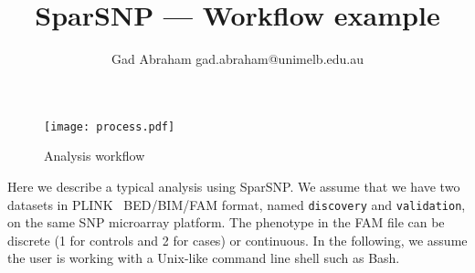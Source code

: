\documentclass[a4paper,11pt]{article}
\title{SparSNP --- Workflow example}
\author{Gad Abraham gad.abraham@unimelb.edu.au}
\begin{document}
\maketitle

\begin{figure}[h]
\centering
\texttt{[image: process.pdf]}
\caption{Analysis workflow}
\label{fig:process}
\end{figure}


Here we describe a typical analysis using SparSNP.  We assume that we have two
datasets in PLINK~\citep{purcell2007} BED/BIM/FAM format, named
\texttt{discovery} and \texttt{validation}, on the same SNP microarray platform.
The phenotype in the FAM file can be discrete (1 for controls and 2 for cases)
or continuous.  In the following, we assume the user is working with a Unix-like
command line shell such as Bash.
\end{document}

